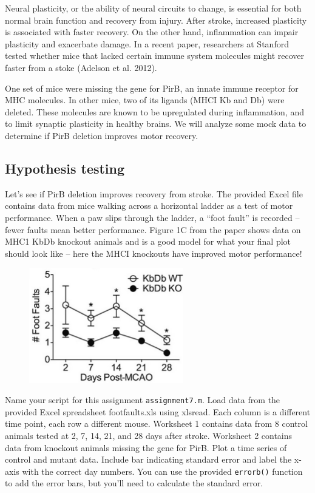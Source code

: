 \documentclass[10pt,letter]{article}
\begin{document}
Neural plasticity, or the ability of neural circuits to change, is essential for both normal brain function and recovery from injury. After stroke, increased plasticity is associated with faster recovery. On the other hand, inflammation can impair plasticity and exacerbate damage. In a recent paper, researchers at Stanford tested whether mice that lacked certain immune system molecules might recover faster from a stoke (Adelson et al. 2012). 

One set of mice were missing the gene for PirB, an innate immune receptor for MHC molecules. In other mice, two of its ligands (MHCI Kb and Db) were deleted. These molecules are known to be upregulated during inflammation, and to limit synaptic plasticity in healthy brains. We will analyze some mock data to determine if PirB deletion improves motor recovery.

\subsection*{Hypothesis testing}

Let’s see if PirB deletion improves recovery from stroke. The provided Excel file contains data from mice walking across a horizontal ladder as a test of motor performance. When a paw slips through the ladder, a “foot fault” is recorded – fewer faults mean better performance. Figure 1C from the paper shows data on MHC1 KbDb knockout animals and is a good model for what your final plot should look like – here the MHCI knockouts have improved motor performance!


\begin{figure}[h!]
\centering
\includegraphics[width=0.6\textwidth]{footfaults.png}
\caption{  }
\label{fig:awesome_image}
\end{figure}


Name your script for this assignment \texttt{assignment7.m}. Load data from the provided Excel spreadsheet footfaults.xls using xlsread. Each column is a different time point, each row a different mouse. Worksheet 1 contains data from 8 control animals tested at 2, 7, 14, 21, and 28 days after stroke. Worksheet 2 contains data from knockout animals missing the gene for PirB. Plot a time series of control and mutant data. Include bar indicating standard error and label the x-axis with the correct day numbers.  You can use the provided \texttt{errorb()} function to add the error bars, but you'll need to calculate the standard error.
\end{document}
